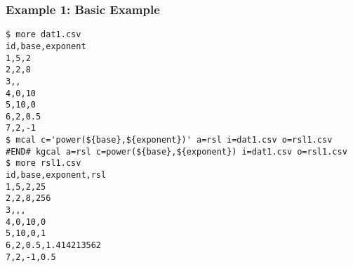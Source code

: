 \subsubsection*{Example 1: Basic Example}



\begin{Verbatim}[baselinestretch=0.7,frame=single]
$ more dat1.csv
id,base,exponent
1,5,2
2,2,8
3,,
4,0,10
5,10,0
6,2,0.5
7,2,-1
$ mcal c='power(${base},${exponent})' a=rsl i=dat1.csv o=rsl1.csv
#END# kgcal a=rsl c=power(${base},${exponent}) i=dat1.csv o=rsl1.csv
$ more rsl1.csv
id,base,exponent,rsl
1,5,2,25
2,2,8,256
3,,,
4,0,10,0
5,10,0,1
6,2,0.5,1.414213562
7,2,-1,0.5
\end{Verbatim}

